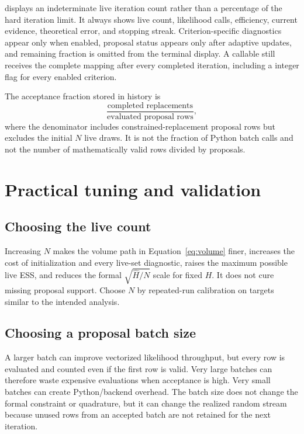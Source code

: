 \documentclass[11pt,a4paper]{article}
\newcommand{\code}[1]{\texttt{\detokenize{#1}}}
\begin{document}
\code{progress=True} displays an indeterminate live iteration count rather
than a percentage of the hard iteration limit.  It always shows live count,
likelihood calls, efficiency, current evidence, theoretical error, and stopping
streak.  Criterion-specific diagnostics appear only when enabled, proposal
status appears only after adaptive updates, and remaining fraction is omitted
from the terminal display.  A callable still receives the complete mapping
after every completed iteration, including a \code{criterion_<name>_met}
integer flag for every enabled criterion.

The acceptance fraction stored in history is
\[
  \frac{\text{completed replacements}}
       {\text{evaluated proposal rows}},
\]
where the denominator includes constrained-replacement proposal rows but
excludes the initial \(N\) live draws.  It is not the fraction of Python batch
calls and not the number of mathematically valid rows divided by proposals.

\section{Practical tuning and validation}

\subsection{Choosing the live count}

Increasing \(N\) makes the volume path in Equation~\eqref{eq:volume} finer,
increases the cost of initialization and every live-set diagnostic, raises the
maximum possible live ESS, and reduces the formal
\(\sqrt{\widehat H/N}\) scale for fixed \(H\).  It does not cure missing
proposal support.  Choose \(N\) by repeated-run calibration on targets similar
to the intended analysis.

\subsection{Choosing a proposal batch size}

A larger batch can improve vectorized likelihood throughput, but every row is
evaluated and counted even if the first row is valid.  Very large batches can
therefore waste expensive evaluations when acceptance is high.  Very small
batches can create Python/backend overhead.  The batch size does not change
the formal constraint or quadrature, but it can change the realized random
stream because unused rows from an accepted batch are not retained for the
next iteration.
\end{document}
